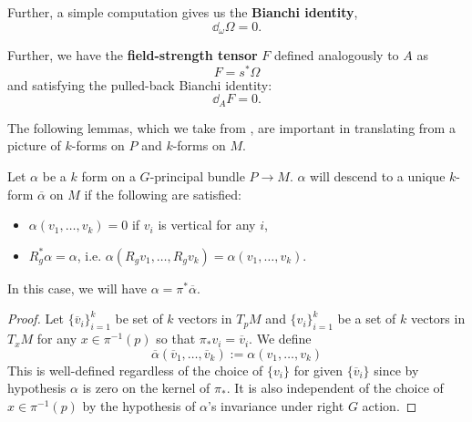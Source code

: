 		Further, a simple computation gives us the \textbf{Bianchi identity},
		\begin{equation}
			\dd_\omega \Omega = 0.
		\end{equation}
		
		Further, we have the \textbf{field-strength tensor} $F$ defined analogously to $A$ as
		\[
			F = s^* \Omega
		\]
		and satisfying the pulled-back Bianchi identity:
		\[
			\dd_A F = 0.
		\]
		
		The following lemmas, which we take from \cite{kobayashi1963}, are important in translating from a picture of $k$-forms on $P$ and $k$-forms on $M$.
		\begin{lemma}
			Let $\alpha$ be a $k$ form on a $G$-principal bundle $P \to M$. $\alpha$ will descend to a unique $k$-form $\overline \alpha$ on $M$ if the following are satisfied:
			\begin{itemize}
				\item $\alpha(v_1, \dots, v_k) = 0$ if $v_i$ is vertical for any $i$,
				\item $R_g^* \alpha = \alpha$, i.e. $\alpha(R_g v_1, \dots, R_g v_k)=\alpha(v_1, \dots, v_k)$.
			\end{itemize}
			In this case, we will have $\alpha = \pi^* \overline \alpha$.
			\label{lem:pushdown1}
		\end{lemma}
		\begin{proof}
			Let $\{\overline v_i\}_{i=1}^k$ be set of $k$ vectors in $T_p M$ and $\{v_i\}_{i=1}^k$ be a set of $k$ vectors in $T_x M$ for any $x \in \pi^{-1} (p)$ so that $\pi_* v_i = \overline v_i$. We define
			\[
				\overline \alpha(\overline v_1, \dots, \overline v_k) := \alpha(v_1, \dots, v_k)
			\]
			This is well-defined regardless of the choice of $\{v_i\}$ for given $\{\overline v_i\}$ since by hypothesis $\alpha$ is zero on the kernel of $\pi_*$. It is also independent of the choice of $x \in \pi^{-1}(p)$ by the hypothesis of $\alpha$'s invariance under right $G$ action.
		\end{proof}
		
